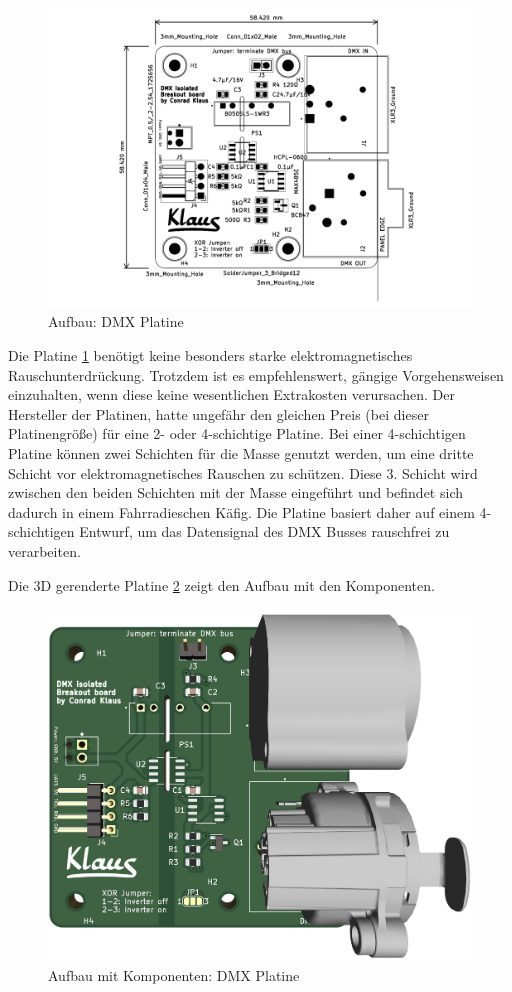 \begin{figure}[H]
	\centering
	\includegraphics[width=0.8\linewidth]{Pictures/KicadPlatinePCB}
	\caption{Aufbau: DMX Platine}
	\label{fig:DmxBreakoutPcb}
\end{figure}

Die Platine \ref{fig:DmxBreakoutPcb} benötigt keine besonders starke elektromagnetisches Rauschunterdrückung. Trotzdem ist es empfehlenswert, gängige Vorgehensweisen einzuhalten, wenn diese keine wesentlichen Extrakosten verursachen.
Der Hersteller der Platinen, hatte ungefähr den gleichen Preis (bei dieser Platinengröße) für eine 2- oder 4-schichtige Platine. Bei einer 4-schichtigen Platine können zwei Schichten für die Masse genutzt werden, um eine dritte Schicht vor elektromagnetisches Rauschen zu schützen. Diese 3. Schicht wird zwischen den beiden Schichten mit der Masse eingeführt und befindet sich dadurch in einem Fahrradieschen Käfig. Die Platine basiert daher auf einem 4-schichtigen Entwurf, um das Datensignal des DMX Busses rauschfrei zu verarbeiten.

Die 3D gerenderte Platine \ref{fig:DmxBreakout3dView} zeigt den Aufbau mit den Komponenten.
\begin{figure}[H]
	\centering
	\hspace*{0.5cm}
	\includegraphics[width=0.5\linewidth]{Pictures/pcbDmxBreakout3dView}
	\caption{Aufbau mit Komponenten: DMX Platine}
	\label{fig:DmxBreakout3dView}
\end{figure}

